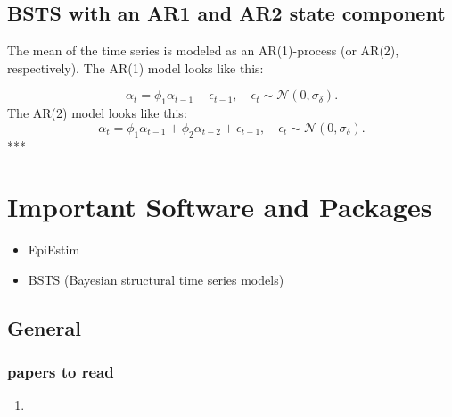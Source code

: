 \subsection{BSTS with an AR1 and AR2 state component}
The mean of the time series is modeled as an AR(1)-process (or AR(2), respectively). The AR(1) model looks like this:

$$\alpha_t = \phi_1 \alpha_{t-1} + \epsilon_{t-1}, \quad \epsilon_t \sim \mathcal{N}(0, \sigma_{\delta}). $$
The AR(2) model looks like this:
$$\alpha_t = \phi_1 \alpha_{t-1} + \phi_2 \alpha_{t-2} + \epsilon_{t-1}, \quad \epsilon_t \sim \mathcal{N}(0, \sigma_{\delta}). $$
***


\section{Important Software and Packages}
\begin{itemize}
\item EpiEstim
\item BSTS (Bayesian structural time series models)
\end{itemize}

\subsection*{General}
\subsubsection*{papers to read}
\begin{enumerate}
	\item 
\end{enumerate}

